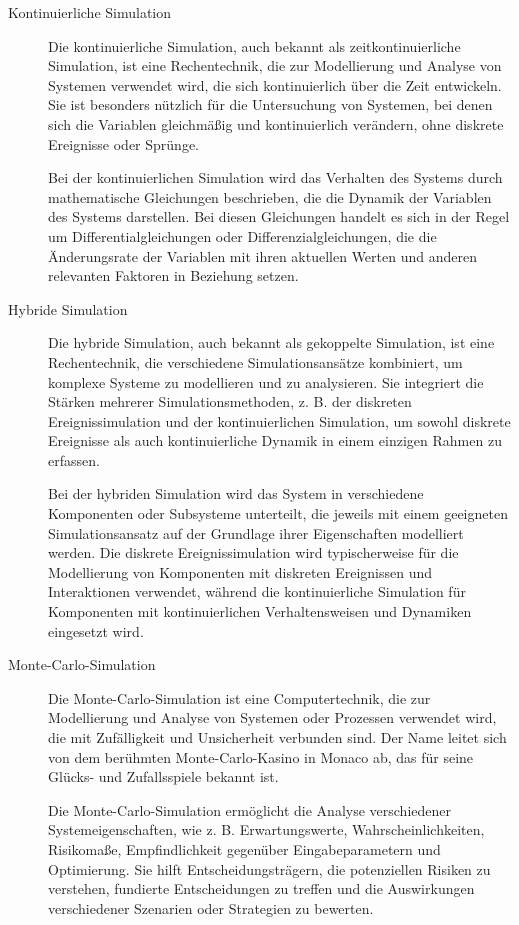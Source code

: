 \begin{description}
    \item[Kontinuierliche Simulation] 
    Die kontinuierliche Simulation, auch bekannt als zeitkontinuierliche Simulation, ist eine Rechentechnik, die zur Modellierung und Analyse von Systemen verwendet wird, die sich kontinuierlich über die Zeit entwickeln. Sie ist besonders nützlich für die Untersuchung von Systemen, bei denen sich die Variablen gleichmäßig und kontinuierlich verändern, ohne diskrete Ereignisse oder Sprünge.

    Bei der kontinuierlichen Simulation wird das Verhalten des Systems durch mathematische Gleichungen beschrieben, die die Dynamik der Variablen des Systems darstellen. Bei diesen Gleichungen handelt es sich in der Regel um Differentialgleichungen oder Differenzialgleichungen, die die Änderungsrate der Variablen mit ihren aktuellen Werten und anderen relevanten Faktoren in Beziehung setzen.
    \cite[vgl.][]{mattern-diskrete-simulation}

    \item[Hybride Simulation] 
    Die hybride Simulation, auch bekannt als gekoppelte Simulation, ist eine Rechentechnik, die verschiedene Simulationsansätze kombiniert, um komplexe Systeme zu modellieren und zu analysieren. Sie integriert die Stärken mehrerer Simulationsmethoden, z. B. der diskreten Ereignissimulation und der kontinuierlichen Simulation, um sowohl diskrete Ereignisse als auch kontinuierliche Dynamik in einem einzigen Rahmen zu erfassen.

    Bei der hybriden Simulation wird das System in verschiedene Komponenten oder Subsysteme unterteilt, die jeweils mit einem geeigneten Simulationsansatz auf der Grundlage ihrer Eigenschaften modelliert werden. Die diskrete Ereignissimulation wird typischerweise für die Modellierung von Komponenten mit diskreten Ereignissen und Interaktionen verwendet, während die kontinuierliche Simulation für Komponenten mit kontinuierlichen Verhaltensweisen und Dynamiken eingesetzt wird.

    \item[Monte-Carlo-Simulation] 
    Die Monte-Carlo-Simulation ist eine Computertechnik, die zur Modellierung und Analyse von Systemen oder Prozessen verwendet wird, die mit Zufälligkeit und Unsicherheit verbunden sind. Der Name leitet sich von dem berühmten Monte-Carlo-Kasino in Monaco ab, das für seine Glücks- und Zufallsspiele bekannt ist.

    Die Monte-Carlo-Simulation ermöglicht die Analyse verschiedener Systemeigenschaften, wie z. B. Erwartungswerte, Wahrscheinlichkeiten, Risikomaße, Empfindlichkeit gegenüber Eingabeparametern und Optimierung. Sie hilft Entscheidungsträgern, die potenziellen Risiken zu verstehen, fundierte Entscheidungen zu treffen und die Auswirkungen verschiedener Szenarien oder Strategien zu bewerten.
    \cite[vgl.][]{monte-carlo-sim}


\end{description}

